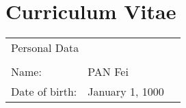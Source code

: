 
\chapter{Curriculum Vitae}

\begin{table}[H]
\begin{tabular}{lll}
\multicolumn{3}{l}{Personal Data}                                               \\
                &                                &                              \\
Name:           & PAN Fei                        &                              \\
Date of birth:  & January 1, 1000                &                              \\
\end{tabular}
\end{table} 